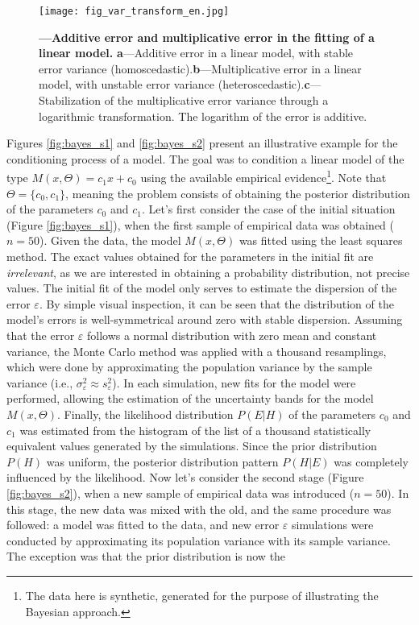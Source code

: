 \documentclass[./main_en.tex]{subfiles}
\begin{document}
\begin{figure}[t!] %
	\centering				
	\texttt{[image: fig\_var\_transform\_en.jpg]}		
	\caption[Additive error and multiplicative error]
	{\textbf{---\;Additive error and multiplicative error in the fitting of a linear \gls{model}.}
        \;\textbf{a}\;---\;Additive error in a linear \gls{model}, with stable error variance (homoscedastic).\;\textbf{b}\;---\;Multiplicative error in a linear \gls{model}, with unstable error variance (heteroscedastic).\;\textbf{c}\;---\;Stabilization of the multiplicative error variance through a logarithmic transformation. The logarithm of the error is additive.
	}
\label{fig:var_transform}  %
\end{figure}

\par Figures \ref{fig:bayes_s1} and \ref{fig:bayes_s2} present an illustrative example for the \gls{conditioning} process of a \gls{model}. The goal was to condition a linear \gls{model} of the type $M(x, \Theta) = c_{1}x + c_{0}$ using the available empirical evidence\footnote{The data here is synthetic, generated for the purpose of illustrating the Bayesian approach.}. Note that $\Theta=\{c_{0}, c_{1}\}$, meaning the problem consists of obtaining the \gls{posterior} distribution of the parameters $c_0$ and $c_1$. Let’s first consider the case of the initial situation (Figure \ref{fig:bayes_s1}), when the first sample of empirical data was obtained ($n=50$). Given the data, the \gls{model} $M(x, \Theta)$ was fitted using the least squares method. The exact values obtained for the parameters in the initial fit are \textit{irrelevant}, as we are interested in obtaining a probability distribution, not precise values. The initial fit of the \gls{model} only serves to estimate the dispersion of the error $\varepsilon$. By simple visual inspection, it can be seen that the distribution of the model's errors is well-symmetrical around zero with stable dispersion. Assuming that the error $\varepsilon$ follows a normal distribution with zero mean and constant variance, the Monte Carlo method was applied with a thousand resamplings, which were done by approximating the population variance by the sample variance (i.e., $\sigma^2_\varepsilon \approx s^2_\varepsilon$). In each simulation, new fits for the \gls{model} were performed, allowing the estimation of the uncertainty bands for the \gls{model} $M(x, \Theta)$. Finally, the \gls{likelihood} distribution $P(E | H)$ of the parameters $c_0$ and $c_1$ was estimated from the histogram of the list of a thousand statistically equivalent values generated by the simulations. Since the prior distribution $P(H)$ was uniform, the posterior distribution pattern $P(H | E)$ was completely influenced by the \gls{likelihood}. Now let’s consider the second stage (Figure \ref{fig:bayes_s2}), when a new sample of empirical data was introduced ($n=50$). In this stage, the new data was mixed with the old, and the same procedure was followed: a \gls{model} was fitted to the data, and new error $\varepsilon$ simulations were conducted by approximating its population variance with its sample variance. The exception was that the prior distribution is now the 
\end{document}
